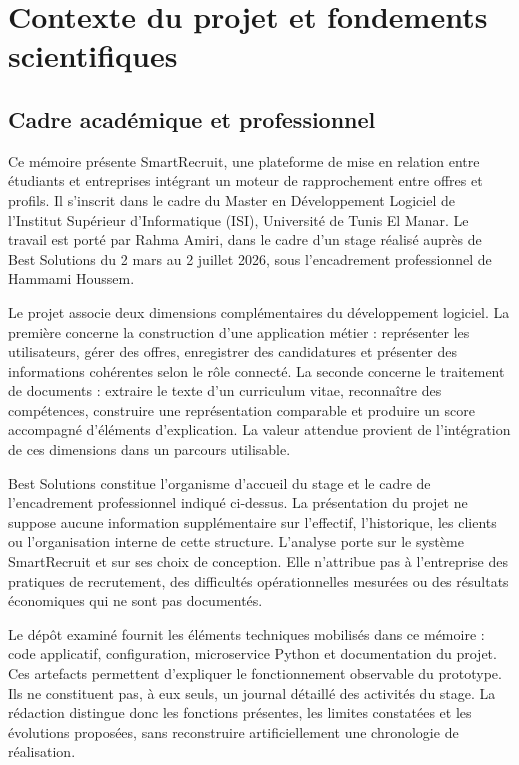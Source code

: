 \chapter{Contexte du projet et fondements scientifiques}
\label{chap:contexte}

\section{Cadre académique et professionnel}

Ce mémoire présente SmartRecruit, une plateforme de mise en relation entre étudiants et entreprises intégrant un moteur de rapprochement entre offres et profils. Il s'inscrit dans le cadre du Master en Développement Logiciel de l'Institut Supérieur d'Informatique (ISI), Université de Tunis El Manar. Le travail est porté par Rahma Amiri, dans le cadre d'un stage réalisé auprès de Best Solutions du 2 mars au 2 juillet 2026, sous l'encadrement professionnel de Hammami Houssem.

Le projet associe deux dimensions complémentaires du développement logiciel. La première concerne la construction d'une application métier : représenter les utilisateurs, gérer des offres, enregistrer des candidatures et présenter des informations cohérentes selon le rôle connecté. La seconde concerne le traitement de documents : extraire le texte d'un curriculum vitae, reconnaître des compétences, construire une représentation comparable et produire un score accompagné d'éléments d'explication. La valeur attendue provient de l'intégration de ces dimensions dans un parcours utilisable.

Best Solutions constitue l'organisme d'accueil du stage et le cadre de l'encadrement professionnel indiqué ci-dessus. La présentation du projet ne suppose aucune information supplémentaire sur l'effectif, l'historique, les clients ou l'organisation interne de cette structure. L'analyse porte sur le système SmartRecruit et sur ses choix de conception. Elle n'attribue pas à l'entreprise des pratiques de recrutement, des difficultés opérationnelles mesurées ou des résultats économiques qui ne sont pas documentés.

Le dépôt examiné fournit les éléments techniques mobilisés dans ce mémoire : code applicatif, configuration, microservice Python et documentation du projet. Ces artefacts permettent d'expliquer le fonctionnement observable du prototype. Ils ne constituent pas, à eux seuls, un journal détaillé des activités du stage. La rédaction distingue donc les fonctions présentes, les limites constatées et les évolutions proposées, sans reconstruire artificiellement une chronologie de réalisation.

